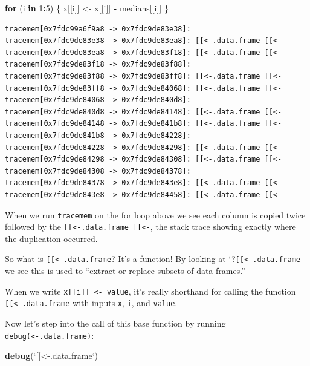 \documentclass[]{book}
\newenvironment{Shaded}{\begin{snugshade}}{\end{snugshade}}
\newcommand{\ControlFlowTok}[1]{\textcolor[rgb]{0.13,0.29,0.53}{\textbf{#1}}}
\newcommand{\DataTypeTok}[1]{\textcolor[rgb]{0.13,0.29,0.53}{#1}}
\newcommand{\DecValTok}[1]{\textcolor[rgb]{0.00,0.00,0.81}{#1}}
\newcommand{\KeywordTok}[1]{\textcolor[rgb]{0.13,0.29,0.53}{\textbf{#1}}}
\newcommand{\NormalTok}[1]{#1}
\newcommand{\OperatorTok}[1]{\textcolor[rgb]{0.81,0.36,0.00}{\textbf{#1}}}
\newcommand{\StringTok}[1]{\textcolor[rgb]{0.31,0.60,0.02}{#1}}
\begin{document}
\begin{Shaded}
\begin{Highlighting}[]
\ControlFlowTok{for}\NormalTok{ (i }\ControlFlowTok{in} \DecValTok{1}\OperatorTok{:}\DecValTok{5}\NormalTok{) \{}
\NormalTok{  x[[i]] <-}\StringTok{ }\NormalTok{x[[i]] }\OperatorTok{-}\StringTok{ }\NormalTok{medians[[i]]}
\NormalTok{\}}
\end{Highlighting}
\end{Shaded}

\begin{verbatim}
tracemem[0x7fdc99a6f9a8 -> 0x7fdc9de83e38]: 
tracemem[0x7fdc9de83e38 -> 0x7fdc9de83ea8]: [[<-.data.frame [[<- 
tracemem[0x7fdc9de83ea8 -> 0x7fdc9de83f18]: [[<-.data.frame [[<- 
tracemem[0x7fdc9de83f18 -> 0x7fdc9de83f88]: 
tracemem[0x7fdc9de83f88 -> 0x7fdc9de83ff8]: [[<-.data.frame [[<- 
tracemem[0x7fdc9de83ff8 -> 0x7fdc9de84068]: [[<-.data.frame [[<- 
tracemem[0x7fdc9de84068 -> 0x7fdc9de840d8]: 
tracemem[0x7fdc9de840d8 -> 0x7fdc9de84148]: [[<-.data.frame [[<- 
tracemem[0x7fdc9de84148 -> 0x7fdc9de841b8]: [[<-.data.frame [[<- 
tracemem[0x7fdc9de841b8 -> 0x7fdc9de84228]: 
tracemem[0x7fdc9de84228 -> 0x7fdc9de84298]: [[<-.data.frame [[<- 
tracemem[0x7fdc9de84298 -> 0x7fdc9de84308]: [[<-.data.frame [[<- 
tracemem[0x7fdc9de84308 -> 0x7fdc9de84378]: 
tracemem[0x7fdc9de84378 -> 0x7fdc9de843e8]: [[<-.data.frame [[<- 
tracemem[0x7fdc9de843e8 -> 0x7fdc9de84458]: [[<-.data.frame [[<- 
\end{verbatim}

When we run \texttt{tracemem} on the for loop above we see each column is copied twice followed by the \texttt{{[}{[}\textless{}-.data.frame\ {[}{[}\textless{}-}, the stack trace showing exactly where the duplication occurred.

So what is \texttt{{[}{[}\textless{}-.data.frame}? It's a function! By looking at `?\texttt{{[}{[}\textless{}-.data.frame} we see this is used to ``extract or replace subsets of data frames.''

When we write \texttt{x{[}{[}i{]}{]}\ \textless{}-\ value}, it's really shorthand for calling the function \texttt{{[}{[}\textless{}-.data.frame} with inputs \texttt{x}, \texttt{i}, and \texttt{value}.

Now let's step into the call of this base function by running \texttt{debug(\textasciigrave{}\textasciigrave{}{[}{[}\textless{}-.data.frame\textasciigrave{}\textasciigrave{})}:

\begin{Shaded}
\begin{Highlighting}[]
\KeywordTok{debug}\NormalTok{(}\StringTok{`}\DataTypeTok{[[<-.data.frame}\StringTok{`}\NormalTok{)}
\end{Highlighting}
\end{Shaded}
\end{document}
